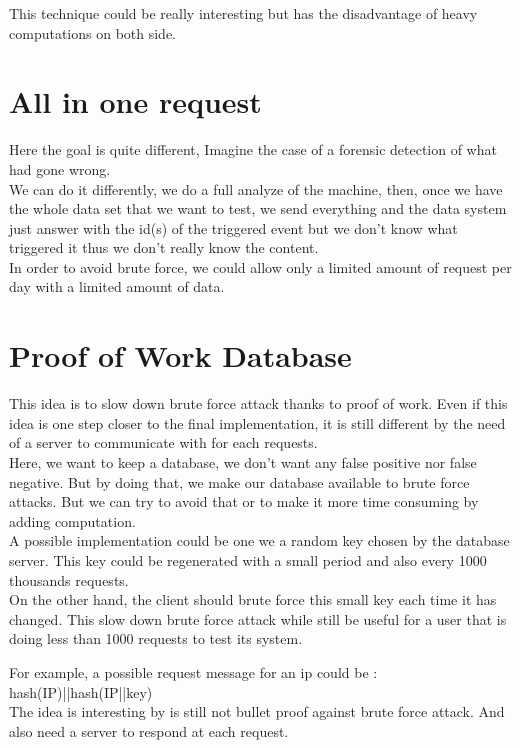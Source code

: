 \documentclass{eplmastersthesis}
\begin{document}
This technique could be really interesting but has the disadvantage of heavy computations on both side.

\section{All in one request}
Here the goal is quite different, Imagine the case of a forensic detection of what had gone wrong.\\
We can do it differently, we do a full analyze of the machine, then, once we have the whole data set that we want to test, we send everything and the data system just answer with the id(s) of the triggered event but we don't know what triggered it thus we don't really know the content.\\
In order to avoid brute force, we could allow only a limited amount of request per day with a limited amount of data.

\section{Proof of Work Database}
This idea is to slow down brute force attack thanks to proof of work. Even if this idea is one step closer to the final implementation, it is still different by the need of a server to communicate with for each requests.\\

Here, we want to keep a database, we don't want any false positive nor false negative. But by doing that, we make our database available to brute force attacks.
But we can try to avoid that or to make it more time consuming by adding computation.\\

A possible implementation could be one we a random key chosen by the database server. This key could be regenerated with a small period and also every 1000 thousands requests.\\
On the other hand, the client should brute force this small key each time it has changed. This slow down brute force attack while still be useful for a user that is doing less than 1000 requests to test its system.

For example, a possible request message for an ip could be : hash(IP)||hash(IP||key)\\

The idea is interesting by is still not bullet proof against brute force attack. And also need a server to respond at each request.
\end{document}
